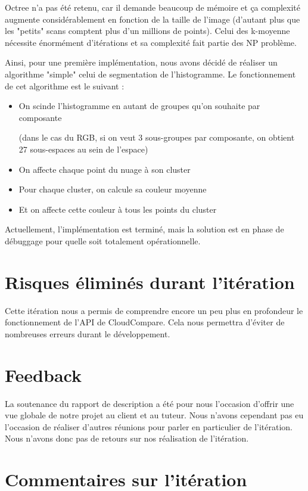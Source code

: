 \documentclass[12pt,titlepage,french]{article}
\begin{document}
Octree n'a pas été retenu, car il demande beaucoup de mémoire et ça complexité augmente considérablement en fonction de la taille de l'image (d'autant plus que les "petits" scans comptent plus d'un millions de points). Celui des k-moyenne nécessite énormément d'itérations et sa complexité fait partie des NP problème.

Ainsi, pour une première implémentation, nous avons décidé de réaliser un algorithme "simple" celui de segmentation de l'histogramme. Le fonctionnement de cet algorithme est le suivant :
\begin{itemize}
    \item On scinde l'histogramme en autant de groupes qu'on souhaite par composante
    
    (dans le cas du RGB, si on veut 3 sous-groupes par composante, on obtient 27 sous-espaces au sein de l'espace)
    \item On affecte chaque point du nuage à son cluster
    \item Pour chaque cluster, on calcule sa couleur moyenne
    \item Et on affecte cette couleur à tous les points du cluster
\end{itemize}

Actuellement, l'implémentation est terminé, mais la solution est en phase de débuggage pour quelle soit totalement opérationnelle.

\section{Risques éliminés durant l'itération}
Cette itération nous a permis de comprendre encore un peu plus en profondeur le fonctionnement de l'API de CloudCompare.
Cela nous permettra d'éviter de nombreuses erreurs durant le développement.

\section{Feedback}

La soutenance du rapport de description a été pour nous l'occasion d'offrir une vue globale de notre projet au client et au tuteur.
Nous n'avons cependant pas eu l'occasion de réaliser d'autres réunions pour parler en particulier de l'itération. Nous n'avons donc pas de retours sur nos réalisation de l'itération.

\section{Commentaires sur l'itération}
\end{document}
